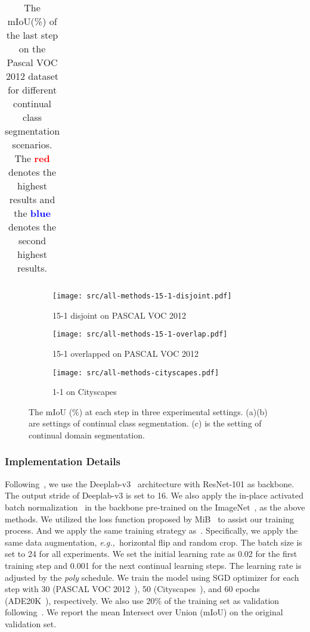 \documentclass[10pt,twocolumn,letterpaper]{article}
\def\eg{\emph{e.g.,~}}
\begin{document}
\begin{table*}[!htp]
\begin{tabular}{l||cc|c||cc|c||cc|c||cc|c||cc|c||cc|c}
\bottomrule

\end{tabular}
\caption{The mIoU(\%) of the last step on the Pascal VOC 2012 dataset for different continual class segmentation scenarios. The \textcolor{red}{\bf{red}} denotes the highest results and the \textcolor{blue}{\bf{blue}} denotes the second highest results. }\label{tab:pascal}
\vskip 0.0in
\end{table*} \begin{figure*}[!tp]
	\centering
	\xdef\xfigwd{\textwidth}
	\begin{subfigure}{0.32\textwidth}
		\texttt{[image: src/all-methods-15-1-disjoint.pdf]}
		\caption{15-1 disjoint on PASCAL VOC 2012} \label{fig:all-disjoint}
	\end{subfigure}
	\begin{subfigure}{0.32\textwidth}
		\texttt{[image: src/all-methods-15-1-overlap.pdf]}
		\caption{15-1 overlapped on PASCAL VOC 2012} \label{fig:all-overlapped}
	\end{subfigure}
	\begin{subfigure}{0.32\textwidth}
		\texttt{[image: src/all-methods-cityscapes.pdf]}
		\caption{1-1 on Cityscapes} \label{fig:all-cityscapes}
	\end{subfigure}
	\caption{The mIoU (\%) at each step in three experimental settings. (a)(b) are settings of continual class segmentation. (c) is the setting of continual domain segmentation.}
\end{figure*}

\subsubsection{Implementation Details}
Following~\cite{mib,sdr,plop},
we use the Deeplab-v3~\cite{chen2017deeplab} architecture with ResNet-101\cite{he2016deep} as backbone.
The output stride of Deeplab-v3 is set to 16.
We also apply the in-place activated batch normalization~\cite{rota2018place} in the backbone pre-trained on the ImageNet~\cite{deng2009imagenet},
as the above methods.
We utilized the loss function proposed by MiB~\cite{mib} to assist our training process.
And we apply the same training strategy as~\cite{mib,plop,sdr}.
Specifically,
we apply the same data augmentation, \eg{horizontal flip and random crop}.
The batch size is set to 24 for all experiments.
We set the initial learning rate as 0.02 for the first training step and 0.001 for the next continual learning steps.
The learning rate is adjusted by the \emph{poly} schedule.
We train the model using SGD optimizer for each step with 30 (PASCAL VOC 2012~\cite{pascal-voc-2012}),
50 (Cityscapes~\cite{cordts2016cityscapes}),
and 60 epochs (ADE20K~\cite{zhou2017scene}), respectively.
We also use 20\% of the training set as validation following~\cite{mib,sdr,plop}.
We report the mean Intersect over Union (mIoU) on
the original validation set.
\end{document}
